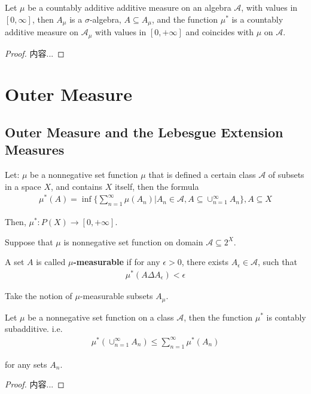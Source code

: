 \documentclass[Total.tex]{subfiles}
\begin{document}
				\begin{proposition}
					Let $\mu$ be a countably additive additive measure on an algebra $\mathcal{A}$, with values in $[0,\infty]$, then $A_\mu$ is a $\sigma$-algebra, $A\subseteq A_\mu$, and the function $\mu^*$ is a countably additive measure on $\mathcal{A}_\mu$ with values in $[0,+\infty]$ and coincides with $\mu$ on $\mathcal{A}$. 
				\end{proposition}
				\begin{proof}
					内容...
				\end{proof}
		\section{Outer Measure}
			\subsection{Outer Measure and the Lebesgue Extension Measures}
				\begin{Def}
					Let: $\mu$ be a nonnegative set function $\mu$ that is defined a certain class $\mathcal{A}$ of subsets in a space $X$, and contains $X$ itself, then the formula
					\begin{gather*}
						\mu^*(A)=\inf\{\sum_{n=1}^\infty \mu(A_n)|A_n\in \mathcal{A},A\subseteq \cup_{n=1}^\infty A_n\},A\subseteq X
					\end{gather*}
					
					Then, $\mu^*:P(X)\rightarrow [0,+\infty]$. 
				\end{Def}
				
				
				\begin{Def}
					Suppose that $\mu$ is nonnegative set function on domain $\mathcal{A}\subseteq 2^X$. 
					
					A set $A$ is called \textbf{$\mu$-measurable} if for any $\epsilon>0$, there exists $A_\epsilon\in \mathcal{A}$, such that
					\begin{gather*}
						\mu^*(A\Delta A_\epsilon)<\epsilon
					\end{gather*}
					
					Take the notion of $\mu$-measurable subsets $A_\mu$. 
				\end{Def}
				
				\begin{lemma}
					Let $\mu$ be a nonnegative set function on a class $\mathcal{A}$, then the function $\mu^*$ is contably subadditive. i.e.
					\begin{gather*}
						\mu^*(\cup_{n=1}^\infty A_n)\leq \sum_{n=1}^\infty \mu^*(A_n)
					\end{gather*}
					
					for any sets $A_n$. 
				\end{lemma}
				\begin{proof}
					内容...
				\end{proof}
				
\end{document}
